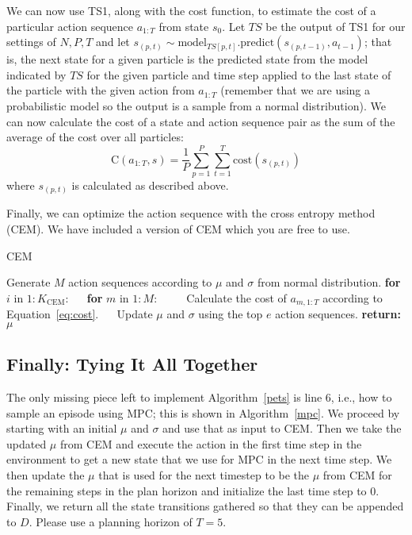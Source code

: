 \documentclass[12pt]{article}
\begin{document}
We can now use TS1, along with the cost function, to estimate the cost of a particular action sequence $a_{1:T}$ from state $s_0$.  Let $TS$ be the output of TS1 for our settings of $N, P, T$ and let $s_{(p,t)} \sim \text{model}_{TS[p,t]}.\text{predict}(s_{(p, t-1)}, a_{t-1})$; that is, the next state for a given particle is the predicted state from the model indicated by $TS$ for the given particle and time step applied to the last state of the particle with the given action from $a_{1:T}$ (remember that we are using a probabilistic model so the output is a sample from a normal distribution).    We can now calculate the cost of a state and action sequence pair as the sum of the average of the cost over all particles:
\begin{equation}\label{eq:cost}
    \text{C}(a_{1:T}, s) = \frac{1}{P}\sum_{p=1}^P\sum_{t=1}^T \text{cost}(s_{(p,t)}) 
\end{equation}
where $s_{(p,t)}$ is calculated as described above.  

Finally, we can optimize the action sequence with the cross entropy method (CEM). We have included a version of CEM which you are free to use.
\begin{algorithm}
\label{alga2d}
\caption{CEM\label{cem}}
\begin{algorithmic}[1]
\State Generate $M$ action sequences according to $\mu$ and $\sigma$ from normal distribution.
\State \textbf{for} $i$ in $1:K_{\text{CEM}}$:
\State $\quad$ \textbf{for} $m$ in $1:M$:
\State $\quad\quad$ Calculate the cost of $a_{m,1:T}$ according to Equation~\ref{eq:cost}.
\State $\quad$ Update $\mu$ and $\sigma$ using the top $e$ action sequences.  
\State \textbf{return:} $\mu$
\EndProcedure
\end{algorithmic}
\end{algorithm}

\subsection*{Finally: Tying It All Together}
The only missing piece left to implement Algorithm~\ref{pets} is line 6, i.e., how to sample an episode using MPC; this is shown in Algorithm~\ref{mpc}.  We proceed by starting with an initial $\mu$ and $\sigma$ and use that as input to CEM.  Then we take the updated $\mu$ from CEM and execute the action in the first time step in the environment to get a new state that we use for MPC in the next time step.  We then update the $\mu$ that is used for the next timestep to be the $\mu$ from CEM for the remaining steps in the plan horizon and initialize the last time step to 0.  Finally, we return all the state transitions gathered so that they can be appended to $D$. Please use a planning horizon of $T=5$.
\end{document}
